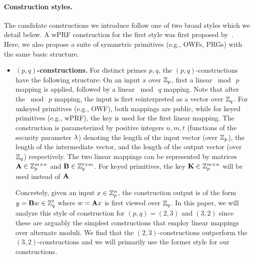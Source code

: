 \paragraph{Construction styles.}
The candidate constructions we introduce follow one of two broad styles which we detail below. A wPRF construction for the first style was first proposed by~\cite{boneh2018-darkmatter}. Here, we also propose a suite of symmetric primitives (e.g., OWFs, PRGs) with the same basic structure.


\begin{itemize}
    \item \textbf{$(p,q)$-constructions.}
    For distinct primes $p, q$, the $(p,q)$-constructions have the following structure: On an input $x$ over $\mathbb{Z}_p$, first a linear $\bmod~p$ mapping is applied, followed by a linear $\bmod~q$ mapping. Note that after the $\bmod~p$ mapping, the input is first reinterpreted as a vector over $\mathbb{Z}_q$. For unkeyed primitives (e.g., OWF), both mappings are public, while for keyed primitives (e.g., wPRF), the key is used for the first linear mapping. The construction is parameterized by positive integers $n, m, t$ (functions of the security parameter $\lambda$) denoting the length of the input vector (over $\mathbb{Z}_p$), the length of the intermediate vector, and the length of the output vector (over $\mathbb{Z}_q$) respectively. The two linear mappings can be represented by matrices $\mat{A} \in \Z_p^{m \times n}$ and $\mat{B} \in \Z_q^{t \times m}$. For keyed primitives, the key $\mat{K} \in \Z_p^{m \times n}$ will be used instead of $\mat{A}$.

    \hspace*{1em} Concretely, given an input $x \in \mathbb{Z}_p^n$, the construction output is of the form $y = \mat{B}w \in \Z_q^t$ where $w = \mat{A}{x}$ is first viewed over $\mathbb{Z}_q$. In this paper, we will analyze this style of construction for $(p,q) = (2,3)$ and $(3,2)$ since these are arguably the simplest constructions that employ linear mappings over alternate moduli. We find that the $(2,3)$-constructions outperform the $(3,2)$-constructions and we will primarily use the former style for our constructions.

    

\end{itemize}
